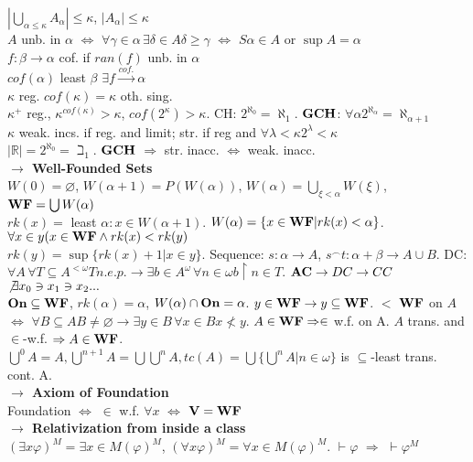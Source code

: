 \documentclass[9pt]{article}
\newcommand{\class}[1]{{\bf #1}}
\newcommand{\R}{\mathbb{R}}
\newcommand{\mytitle}[1]{ {\bf $\rightarrow$ #1}\\}
\newcommand{\On}{\class{On}}
\newcommand{\V}{\class{V}}
\newcommand{\WF}{\class{WF}}
\begin{document}
\begin{multicols*}{2}
$|\bigcup\limits_{\alpha\leqslant \kappa}A_\alpha|\leqslant\kappa$, $|A_\alpha|\leqslant\kappa$\\
$A$ unb. in $\alpha$ $\Leftrightarrow$ $\forall\gamma\in\alpha\,\exists\delta\in A\delta\geqslant\gamma$ $\Leftrightarrow$ $S\alpha\in A$ or $\sup A=\alpha$\\
$f\colon\beta\to\alpha$ cof. if $ran(f)$ unb. in $\alpha$\\
$cof(\alpha)$ least $\beta$ $\exists f\overset{cof.}{\to}\alpha$\\
$\kappa$ reg. $cof(\kappa)=\kappa$ oth. sing.\\
$\kappa^+$ reg., $\kappa^{cof(\kappa)}>\kappa$, $cof(2^\kappa)>\kappa$.
CH: $2^{\aleph_0}=\aleph_1$. $\class{GCH}$: $\forall\alpha 2^{\aleph_\alpha}=\aleph_{\alpha+1}$\\
$\kappa$ weak. incs. if reg. and limit; str. if reg and $\forall\lambda<\kappa 2^\lambda<\kappa$\\
$|\R|=2^{\aleph_0}=\beth_1$. $\class{GCH}$ $\Rightarrow$ str. inacc. $\Leftrightarrow$ weak. inacc.\\
\mytitle{Well-Founded Sets}
$W(0)=\varnothing$, $W(\alpha+1)=P(W(\alpha))$, $W(\alpha)=\bigcup\limits_{\xi<\alpha}W(\xi)$, $\WF=\bigcup\limits W(\alpha)$\\
$rk(x)=$ least $\alpha\colon x\in W(\alpha+1)$. $W(\alpha)=\{x\in \WF|rk(x)<\alpha\}$. $\forall x\in y (x\in \WF\wedge rk(x)<rk(y)$\\
$rk(y)=\sup\{rk(x)+1|x\in y\}$. Sequence: $s\colon\alpha\to A$, $s^\smallfrown t\colon \alpha+\beta\to A\cup B$.
DC: $\forall A\,\forall T\subseteq A^{<\omega} T n.e.p. \to \exists b\in A^\omega \,\forall n\in\omega b\upharpoonright n\in T$. $\class{AC}\to DC\to CC$\\
$\not\exists x_0\ni x_1\ni x_2...$\\ $\On\subseteq \WF$, $rk(\alpha)=\alpha$, $W(\alpha)\cap \On=\alpha$. $y\in \WF\to y\subseteq \WF$. $<$ $\WF$ on $A$ $\Leftrightarrow$ $\forall B\subseteq A B\neq \varnothing\to\exists y\in B\,\forall x\in B x\nless y$. $A\in \WF\Rightarrow \in$ w.f. on A. $A$ trans. and $\in$-w.f. $\Rightarrow A\in \WF$.\\
$\bigcup^0A=A,\bigcup^{n+1}A=\bigcup\bigcup^{n}A,tc(A)=\bigcup\{\bigcup^n A|n\in\omega\}$ is $\subseteq$-least trans. cont. A.\\
\mytitle{Axiom of Foundation}
Foundation $\Leftrightarrow$ $\in$ w.f. $\forall x$ $\Leftrightarrow$ $\V=\WF$\\
\mytitle{Relativization from inside a class}
$(\exists x \varphi)^M=\exists x\in M(\varphi)^M$, $(\forall x \varphi)^M=\forall x\in M(\varphi)^M$. $\vdash\varphi$ $\Rightarrow$ $\vdash\varphi^M$\\

\end{multicols*}
\end{document}
